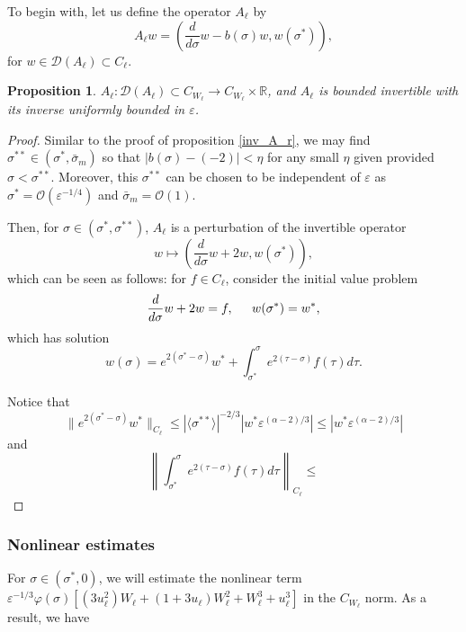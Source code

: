\documentclass[letterpaper,11pt]{article}
\newcommand{\rmO}{\mathcal{O}}
\newcommand{\eps}{\varepsilon}
\numberwithin{equation}{section}
\theoremstyle{plain}
\newtheorem{proposition}[theorem]{Proposition}
\begin{document}
To begin with, let us define the operator $A_\ell$ by 
\[
A_\ell w = \left(\frac{d}{d\sigma}w - b(\sigma)w, w(\sigma^*)\right),
\] 
for $w \in \mathcal{D}(A_\ell) \subset C_{\ell}.$

\begin{proposition}
$A_\ell : \mathcal{D}(A_\ell) \subset C_{W_\ell} \to C_{W_\ell} \times \mathbb{R}$, and $A_\ell$ is bounded invertible with its inverse uniformly bounded in $\eps$.
\end{proposition}


\begin{proof}
Similar to the proof of proposition \ref{inv_A_r}, we may find $\sigma^{**} \in (\sigma^*, \bar{\sigma}_m)$ so that $|b(\sigma)-(-2)|<\eta$ for any small $\eta$ given provided $\sigma < \sigma^{**}$. Moreover, this $\sigma^{**}$ can be chosen to be independent of $\eps$ as $\sigma^* = \rmO(\eps^{-1/4})$ and $\bar{\sigma}_m = \rmO(1)$.

Then, for $\sigma \in (\sigma^*, \sigma^{**})$, $A_\ell$ is a perturbation of the invertible operator 
\[
w \mapsto \left(\frac{d}{d\sigma}w+2w, w(\sigma^*)\right),
\]
 which can be seen as follows: for $f \in C_{\ell}$, consider the initial value problem
 \[
 \frac{d}{d\sigma}w + 2w = f, \hspace{0.2in} w(\sigma^*) = w^*,
 \]
 which has solution 
 \[
 w(\sigma) = e^{2(\sigma^*-\sigma)}w^* + \int_{\sigma^*}^\sigma e^{2(\tau-\sigma)} f(\tau) d\tau.
 \]
 
 Notice that
 \[
 \|e^{2(\sigma^*-\sigma)} w^*\|_{C_\ell}  \le |\langle \sigma^{**}\rangle|^{-2/3} |w^* \eps^{(\alpha-2)/3}| \le |w^*\eps^{(\alpha-2)/3}|
 \]
 and
 \[
\left\| \int_{\sigma^*}^{\sigma} e^{2(\tau-\sigma)} f(\tau)d\tau \right\|_{C_\ell} \le 
 \]
\end{proof}


\subsubsection{Nonlinear estimates}

For $\sigma \in (\sigma^* , 0)$, we will estimate the nonlinear term $\eps^{-1/3}\varphi(\sigma)\left[ (3u_\ell^2)W_\ell + (1+3u_\ell)W_\ell^2 + W_\ell^3+u_\ell^3\right]$ in the $C_{W_\ell}$ norm. As a result, we have
\end{document}
